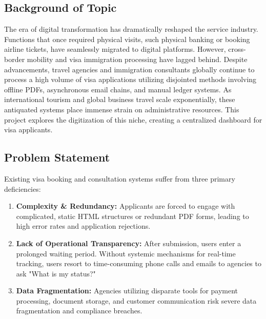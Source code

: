 \documentclass[12pt, a4paper]{article}
\begin{document}
\subsection{Background of Topic}
The era of digital transformation has dramatically reshaped the service industry. Functions that once required physical visits, such physical banking or booking airline tickets, have seamlessly migrated to digital platforms. However, cross-border mobility and visa immigration processing have lagged behind. Despite advancements, travel agencies and immigration consultants globally continue to process a high volume of visa applications utilizing disjointed methods involving offline PDFs, asynchronous email chains, and manual ledger systems. As international tourism and global business travel scale exponentially, these antiquated systems place immense strain on administrative resources. This project explores the digitization of this niche, creating a centralized dashboard for visa applicants.

\subsection{Problem Statement}
Existing visa booking and consultation systems suffer from three primary deficiencies:
\begin{enumerate}
    \item \textbf{Complexity \& Redundancy:} Applicants are forced to engage with complicated, static HTML structures or redundant PDF forms, leading to high error rates and application rejections.
    \item \textbf{Lack of Operational Transparency:} After submission, users enter a prolonged waiting period. Without systemic mechanisms for real-time tracking, users resort to time-consuming phone calls and emails to agencies to ask "What is my status?"
    \item \textbf{Data Fragmentation:} Agencies utilizing disparate tools for payment processing, document storage, and customer communication risk severe data fragmentation and compliance breaches.
\end{enumerate}
\end{document}
